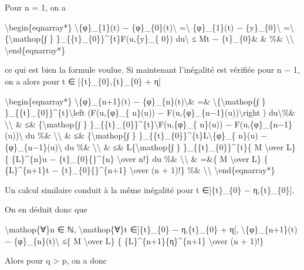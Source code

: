 \documentclass[]{article}
\begin{document}
Pour n = 1, on a

\textbackslash{}begin\{eqnarray*\}
\textbackslash{}\textbar{}\{φ\}\_\{1\}(t) −
\{φ\}\_\{0\}(t)\textbackslash{}\textbar{} =\textbackslash{}\textbar{}
\{φ\}\_\{1\}(t) − \{y\}\_\{0\}\textbackslash{}\textbar{}
=\textbackslash{}\textbar{}\{\textbackslash{}mathop\{∫ \}
\}\_\{\{t\}\_\{0\}\}\^{}\{t\}F(u,\{y\}\_\{ 0\})
du\textbackslash{}\textbar{} ≤ M\textbar{}t − \{t\}\_\{0\}\textbar{}\&
\& \%\& \textbackslash{}\textbackslash{}
\textbackslash{}end\{eqnarray*\}

ce qui est bien la formule voulue. Si maintenant l'inégalité est
vérifiée pour n − 1, on a alors pour t ∈ {[}\{t\}\_\{0\},\{t\}\_\{0\} +
η{[}

\textbackslash{}begin\{eqnarray*\}
\textbackslash{}\textbar{}\{φ\}\_\{n+1\}(t) −
\{φ\}\_\{n\}(t)\textbackslash{}\textbar{}\& =\&
\textbackslash{}\textbar{}\{\textbackslash{}mathop\{∫ \}
\}\_\{\{t\}\_\{0\}\}\^{}\{t\}\textbackslash{}left (F(u,\{φ\}\_\{ n\}(u))
− F(u,\{φ\}\_\{n−1\}(u))\textbackslash{}right )
du\textbackslash{}\textbar{}\%\& \textbackslash{}\textbackslash{} \& ≤\&
\{\textbackslash{}mathop\{∫ \}
\}\_\{\{t\}\_\{0\}\}\^{}\{t\}\textbackslash{}\textbar{}F(u,\{φ\}\_\{
n\}(u)) − F(u,\{φ\}\_\{n−1\}(u))\textbackslash{}\textbar{} du \%\&
\textbackslash{}\textbackslash{} \& ≤\& \{\textbackslash{}mathop\{∫ \}
\}\_\{\{t\}\_\{0\}\}\^{}\{t\}L\textbackslash{}\textbar{}\{φ\}\_\{ n\}(u)
− \{φ\}\_\{n−1\}(u)\textbackslash{}\textbar{} du \%\&
\textbackslash{}\textbackslash{} \& ≤\& L\{\textbackslash{}mathop\{∫ \}
\}\_\{\{t\}\_\{0\}\}\^{}\{t\}\{ M \textbackslash{}over L\} \{
\{L\}\^{}\{n\}\textbar{}u − \{t\}\_\{0\}\{\textbar{}\}\^{}\{n\}
\textbackslash{}over n!\} du \%\& \textbackslash{}\textbackslash{} \&
=\&\{ M \textbackslash{}over L\} \{ \{L\}\^{}\{n+1\}\textbar{}t −
\{t\}\_\{0\}\{\textbar{}\}\^{}\{n+1\} \textbackslash{}over (n + 1)!\}
\%\& \textbackslash{}\textbackslash{} \textbackslash{}end\{eqnarray*\}

Un calcul similaire conduit à la même inégalité pour t ∈{]}\{t\}\_\{0\}
− η,\{t\}\_\{0\}{]}.

On en déduit donc que

\textbackslash{}mathop\{∀\}n ∈ ℕ, \textbackslash{}mathop\{∀\}t
∈{]}\{t\}\_\{0\} − η,\{t\}\_\{0\} + η{[},
\textbackslash{}\textbar{}\{φ\}\_\{n+1\}(t) −
\{φ\}\_\{n\}(t)\textbackslash{}\textbar{} ≤\{ M \textbackslash{}over L\}
\{ \{L\}\^{}\{n+1\}\{η\}\^{}\{n+1\} \textbackslash{}over (n + 1)!\}

Alors pour q \textgreater{} p, on a donc
\end{document}
